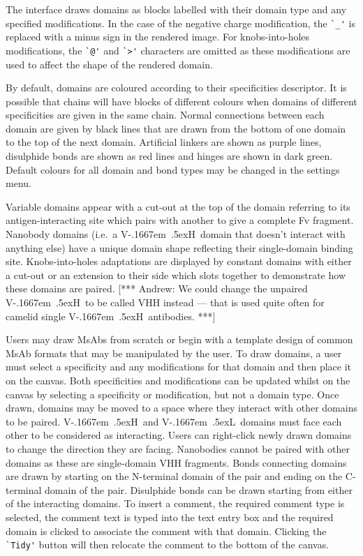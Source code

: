 \documentclass[a4]{article}
\newcommand{\VH}{\mbox{V\kern-.1667em \lower.5ex\hbox{\scriptsize H}}}
\newcommand{\VL}{\mbox{V\kern-.1667em \lower.5ex\hbox{\scriptsize L}}}
\newcommand{\andrew}[1]{{\color{red} [*** Andrew: #1 ***]}}
\begin{document}
The interface draws domains as blocks labelled with their domain type
and any specified modifications.  In the case of the negative charge
modification, the \verb|`_'| is replaced with a minus sign in the
rendered image.  For knobs-into-holes modifications, the \verb|`@'|
and \verb|`>'| characters are omitted as these modifications are used
to affect the shape of the rendered domain.

By default, domains are coloured according
to their specificities descriptor. It is possible that chains will
have blocks of different colours when domains of different
specificities are given in the same chain.
Normal connections between each domain are given by black lines that
are drawn from the bottom of one domain to the top of the next
domain. Artificial linkers are shown as purple lines, disulphide bonds
are shown as red lines and hinges are shown in dark green. Default
colours for all domain and bond types 
may be changed in the settings menu.


Variable domains appear
with a cut-out at the top of the domain referring to its
antigen-interacting site which pairs with another to give a complete
Fv fragment. Nanobody domains (i.e.\ a \VH\ domain that doesn't interact with
anything else) have a unique domain shape reflecting their single-domain
binding site. Knobs-into-holes adaptations are displayed by constant
domains with either a cut-out or an extension to their side which
slots together to demonstrate how these domains are paired.
\andrew{We could change the unpaired \VH\ to be called VHH instead ---
  that is used quite often for camelid single \VH\ antibodies.}

Users may draw MsAbs from scratch or begin with a template design of
common MsAb formats that may be manipulated by the user. To draw
domains, a user must select a specificity and any modifications for that domain
and then place it on the canvas. Both specificities and modifications
can be updated whilst on the canvas by selecting a specificity or
modification, but not a domain type. Once drawn, domains may be
moved to a space where they interact with other domains to be
paired. \VH\ and \VL\ domains must face each other to be considered as
interacting. Users can right-click newly drawn domains to change the
direction they are facing. Nanobodies cannot be paired with other
domains as these are single-domain VHH fragments. Bonds connecting
domains are drawn by starting on the N-terminal domain of the pair and ending on
the C-terminal domain of the pair. Disulphide bonds can be drawn starting from either
of the interacting domains. To insert a comment, the required
comment type is selected, the comment text is typed into the
text entry box and the required domain is clicked to associate the
comment with that domain.  Clicking the \verb|`Tidy'| button will then
relocate the comment to the bottom of the canvas.
\end{document}
